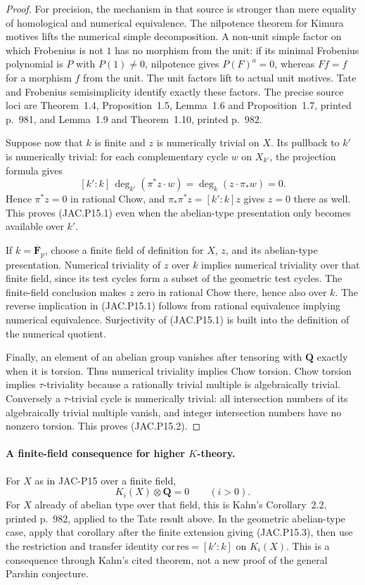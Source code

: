 \documentclass[11pt,a4paper]{article}
\begin{document}
\begin{proof}
For precision, the mechanism in that source is stronger than
mere equality of homological and numerical equivalence. The
nilpotence theorem for Kimura motives lifts the numerical simple
decomposition. A non-unit simple factor on which Frobenius is
not $1$ has no morphism from the unit: if its minimal Frobenius
polynomial is $P$ with $P(1)\ne0$, nilpotence gives
$P(F)^a=0$, whereas $Ff=f$ for a morphism $f$ from the unit.
The unit factors lift to actual unit motives. Tate and Frobenius
semisimplicity identify exactly these factors. The precise source
loci are Theorem~1.4, Proposition~1.5, Lemma~1.6 and
Proposition~1.7, printed p.~981, and Lemma~1.9 and
Theorem~1.10, printed p.~982.

Suppose now that $k$ is finite and $z$ is numerically trivial on
$X$. Its pullback to $k'$ is numerically trivial: for each
complementary cycle $w$ on $X_{k'}$, the projection formula gives
\[
 [k':k]\,\deg_{k'}(\pi^*z\cdot w)
       =\deg_k(z\cdot\pi_*w)=0.
\]
Hence $\pi^*z=0$ in rational Chow, and
$\pi_*\pi^*z=[k':k]z$ gives $z=0$ there as well.
This proves (JAC.P15.1) even when the abelian-type presentation
only becomes available over $k'$.

If $k=\overline{\mathbf F}_p$, choose a finite field of definition
for $X$, $z$, and its abelian-type presentation. Numerical
triviality of $z$ over $k$ implies numerical triviality over that
finite field, since its test cycles form a subset of the geometric
test cycles. The finite-field conclusion makes $z$ zero in
rational Chow there, hence also over $k$. The reverse implication
in (JAC.P15.1) follows from rational equivalence implying numerical
equivalence. Surjectivity of (JAC.P15.1) is built into the
definition of the numerical quotient.

Finally, an element of an abelian group vanishes after tensoring
with $\mathbf Q$ exactly when it is torsion. Thus numerical
triviality implies Chow torsion. Chow torsion implies
$\tau$-triviality because a rationally trivial multiple is
algebraically trivial. Conversely a $\tau$-trivial cycle is
numerically trivial: all intersection numbers of its algebraically
trivial multiple vanish, and integer intersection numbers have
no nonzero torsion. This proves (JAC.P15.2).
\end{proof}

\paragraph{A finite-field consequence for higher $K$-theory.}
For $X$ as in JAC-P15 over a finite field,
\[
                    K_i(X)\otimes\mathbf Q=0
                    \qquad(i>0).                         \tag{JAC.P15.4}
\]
For $X$ already of abelian type over that field, this is Kahn's
Corollary~2.2, printed p.~982, applied to the Tate result above.
In the geometric abelian-type case, apply that corollary after
the finite extension giving (JAC.P15.3), then use the restriction
and transfer identity $\mathrm{cor}\,\mathrm{res}=[k':k]$ on
$K_i(X)$. This is a consequence through Kahn's cited theorem,
not a new proof of the general Parshin conjecture.
\end{document}
